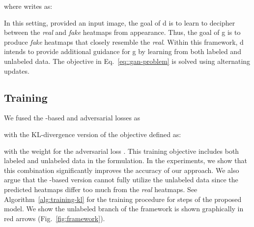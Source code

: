 \documentclass[10pt,twocolumn,letterpaper]{article}
\begin{document}
where  writes as:



In this setting, provided an input image, the goal of \gls{d} is to learn to decipher between the \textit{real} and \textit{fake} heatmaps from appearance. Thus, the goal of \gls{g} is to produce \textit{fake} heatmaps that closely resemble the \textit{real}. Within this framework, \gls{d} intends to provide additional guidance for \gls{g} by learning from both labeled and unlabeled data. The objective in Eq.~\ref{eq::gan-problem} is solved using alternating updates.


\subsection{Training}
\label{sec:training}
We fused the -based and adversarial losses as 

with the KL-divergence version of the objective defined as:

with the weight for the adversarial loss . This training objective includes both labeled and unlabeled data in the formulation. In the experiments, we show that this combination significantly improves the accuracy of our approach. We also argue that the -based version cannot fully utilize the unlabeled data since the predicted heatmaps differ too much from the \textit{real} heatmaps. See Algorithm~\ref{alg:training-kl} for the training procedure for  steps of the proposed model. We show the unlabeled branch of the framework is shown graphically in red arrows (Fig.~\ref{fig:framework}).
\end{document}
